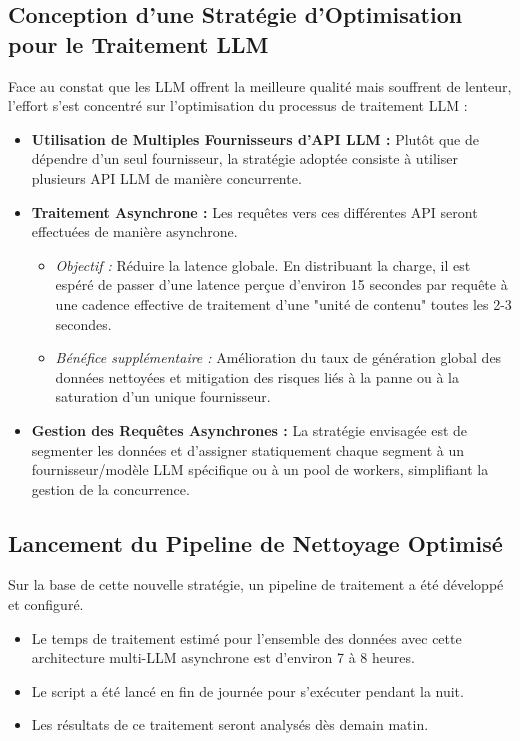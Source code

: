 \documentclass[12pt, a4paper]{article}
\begin{document}
\subsection{Conception d'une Stratégie d'Optimisation pour le Traitement LLM}
Face au constat que les LLM offrent la meilleure qualité mais souffrent de lenteur, l'effort s'est concentré sur l'optimisation du processus de traitement LLM :
\begin{itemize}
    \item \textbf{Utilisation de Multiples Fournisseurs d'API LLM :} Plutôt que de dépendre d'un seul fournisseur, la stratégie adoptée consiste à utiliser plusieurs API LLM de manière concurrente.
    \item \textbf{Traitement Asynchrone :} Les requêtes vers ces différentes API seront effectuées de manière asynchrone.
    \begin{itemize}
        \item \textit{Objectif :} Réduire la latence globale. En distribuant la charge, il est espéré de passer d'une latence perçue d'environ 15 secondes par requête à une cadence effective de traitement d'une "unité de contenu" toutes les 2-3 secondes.
        \item \textit{Bénéfice supplémentaire :} Amélioration du taux de génération global des données nettoyées et mitigation des risques liés à la panne ou à la saturation d'un unique fournisseur.
    \end{itemize}
    \item \textbf{Gestion des Requêtes Asynchrones :} La stratégie envisagée est de segmenter les données et d'assigner statiquement chaque segment à un fournisseur/modèle LLM spécifique ou à un pool de workers, simplifiant la gestion de la concurrence.
\end{itemize}

\subsection{Lancement du Pipeline de Nettoyage Optimisé}
Sur la base de cette nouvelle stratégie, un pipeline de traitement a été développé et configuré.
\begin{itemize}
    \item Le temps de traitement estimé pour l'ensemble des données avec cette architecture multi-LLM asynchrone est d'environ 7 à 8 heures.
    \item Le script a été lancé en fin de journée pour s'exécuter pendant la nuit.
    \item Les résultats de ce traitement seront analysés dès demain matin.
\end{itemize}
\end{document}

